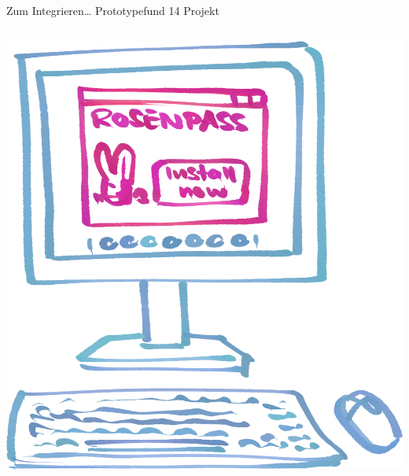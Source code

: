 \documentclass{rosenpass-beamer}
\begin{document}
\begin{frame}{Zum Integrieren… Prototypefund 14 Projekt}
\begin{columns}[c]
\begin{column}{0.2\textwidth}
\medskip
\includegraphics[width=\linewidth]{graphics/Illu-install.png}

\end{column}
\end{columns}


\end{frame}
\end{document}
